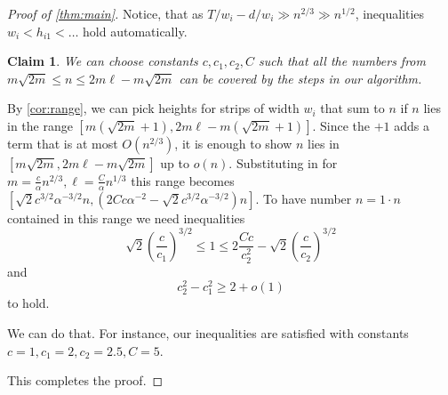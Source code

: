 \documentclass[10pt,a4paper]{amsart}
\newtheorem{claim}{Claim}
\begin{document}
\begin{proof}[Proof of \cref{thm:main}]
Notice, that as $T/w_i - d/w_i \gg n^{2/3} \gg n^{1/2}$, inequalities $w_i < h_{i1} < \ldots$ hold automatically.
\begin{claim}\label{clm:constants}
     We can choose constants $c,c_1,c_2,C$ such that all the numbers from $m\sqrt{2m}\leq n \leq 2m\ell - m\sqrt{2m}$ can be covered by the steps in our algorithm.   
\end{claim}

By \cref{cor:range}, we can pick heights for strips of width $w_i$ that sum to $n$ if $n$ lies in the range $[m(\sqrt{2m}+1), 2m\ell - m(\sqrt{2m}+1)]$. Since the $+1$ adds a term that is at most $O(n^{2/3})$, it is enough to show $n$ lies in $[m\sqrt{2m}, 2m\ell - m\sqrt{2m}]$ up to $o(n)$. Substituting in for $m =  \frac{c}{\alpha}n^{2/3}, \ell =  \frac{C}{\alpha}n^{1/3} $ this range becomes $ [\sqrt{2}c^{3/2}\alpha^{-3/2}n, (2Cc\alpha^{-2} - \sqrt{2}c^{3/2}\alpha^{-3/2})n]$. To have number $n = 1 \cdot n$ contained in this range we need inequalities
\[
\sqrt{2}\left(\frac{c}{c_1}\right)^{3/2} 
\leq 
1 
\leq 
2\frac{Cc}{c_2^2} - \sqrt{2}\left(\frac{c}{c_2}\right)^{3/2}
\]
and
\[
c_2^2 - c_1^2 \geq 2 + o(1)
\]
to hold.

We can do that. For instance, our inequalities are satisfied with constants $c = 1, c_1=2, c_2=2.5 ,  C = 5$.

This completes the proof.
\end{proof}
\end{document}

